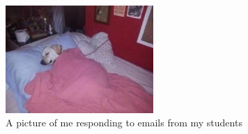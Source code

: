 \begin{figure}[htbp]
  \centering
  \includegraphics[width=0.5\textwidth]{fig/img/me.jpg}
  \caption{A picture of me responding to emails from my students}
  \label{fig:me}
\end{figure}
